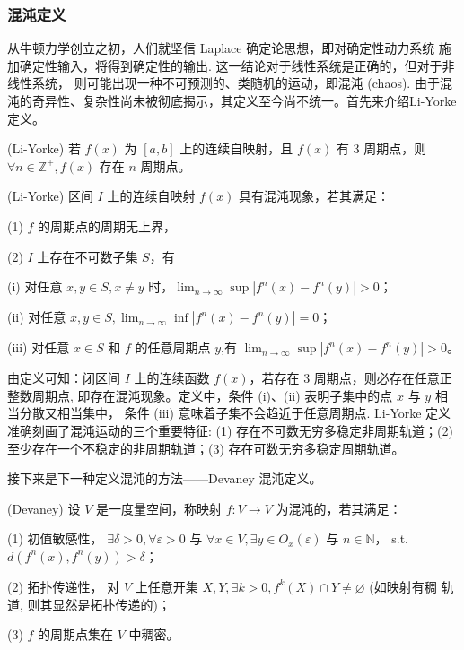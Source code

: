 \subsubsection{混沌定义}
从牛顿力学创立之初，人们就坚信 Laplace 确定论思想，即对确定性动力系统 施加确定性输入，将得到确定性的输出. 这一结论对于线性系统是正确的，但对于非线性系统，
则可能出现一种不可预测的、类随机的运动，即混沌 (chaos). 由于混沌的奇异性、复杂性尚未被彻底揭示，其定义至今尚不统一。首先来介绍Li-Yorke 定义。
\begin{theorem}(Li-Yorke)
    若 $f(x)$ 为 $[a, b]$ 上的连续自映射，且 $f(x)$ 有 3 周期点，则 $\forall n \in \mathbb{Z}^{+}, f(x)$ 存在 $n$ 周期点。
\end{theorem}
\begin{definition}(Li-Yorke)
区间 $I$ 上的连续自映射 $f(x)$ 具有混沌现象，若其满足：\par
(1) $f$ 的周期点的周期无上界，\par
(2) $I$ 上存在不可数子集 $S$，有\par
(i) 对任意 $x, y \in S, x \neq y$ 时，$\lim _{n \rightarrow \infty} \sup \left|f^n(x)-f^n(y)\right|>0$；\par
(ii) 对任意 $x, y \in S, \lim _{n \rightarrow \infty} \inf \left|f^n(x)-f^n(y)\right|=0$；\par
(iii) 对任意 $x \in S$ 和 $f$ 的任意周期点 $y$,有 $\lim _{n \rightarrow \infty} \sup \left|f^n(x)-f^n(y)\right|>0$。
\end{definition}
由定义可知：闭区间 $I$ 上的连续函数 $f (x)$，若存在 3 周期点，则必存在任意正整数周期点, 即存在混沌现象。定义中，条件 (i)、(ii) 表明子集中的点 $x$ 与 $y$ 相当分散又相当集中，
条件 (iii) 意味着子集不会趋近于任意周期点. Li-Yorke 定义准确刻画了混沌运动的三个重要特征:
(1) 存在不可数无穷多稳定非周期轨道；(2) 至少存在一个不稳定的非周期轨道；(3) 存在可数无穷多稳定周期轨道。\par
接下来是下一种定义混沌的方法——Devaney 混沌定义。
\begin{definition}(Devaney)
设 $V$ 是一度量空间，称映射 $f: V \rightarrow V$ 为混沌的，若其满足：\par
(1) 初值敏感性， $\exists \delta>0, \forall \varepsilon>0$ 与 $\forall x \in V, \exists y \in O_x(\varepsilon)$ 与 $n \in \mathbb{N}$， s.t. $d\left(f^n(x), f^n(y)\right)>\delta$；\par
(2) 拓扑传递性， 对 $V$ 上任意开集 $X, Y, \exists k>0, f^k(X) \cap Y \neq \varnothing$ (如映射有稠 轨道, 则其显然是拓扑传递的)；\par
(3) $f$ 的周期点集在 $V$ 中稠密。
\end{definition}

